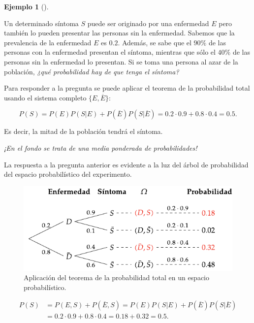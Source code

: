 \documentclass[
  a4paper,
]{scrreport}
\theoremstyle{plain}
\theoremstyle{definition}
\newtheorem{example}{Ejemplo}[chapter]
\theoremstyle{definition}
\theoremstyle{remark}
\begin{document}
\begin{example}[]\protect\hypertarget{exm-probabilidad-total}{}\label{exm-probabilidad-total}

Un determinado síntoma \(S\) puede ser originado por una enfermedad
\(E\) pero también lo pueden presentar las personas sin la enfermedad.
Sabemos que la prevalencia de la enfermedad \(E\) es \(0.2\). Además, se
sabe que el \(90\%\) de las personas con la enfermedad presentan el
síntoma, mientras que sólo el \(40\%\) de las personas sin la enfermedad
lo presentan. Si se toma una persona al azar de la población, \emph{¿qué
probabilidad hay de que tenga el síntoma?}

Para responder a la pregunta se puede aplicar el teorema de la
probabilidad total usando el sistema completo \(\{E,\overline{E}\}\):

\[P(S) = P(E)P(S|E)+P(\overline E)P(S|\overline E) = 0.2\cdot 0.9 + 0.8\cdot 0.4 = 0.5.\]

Es decir, la mitad de la población tendrá el síntoma.

\emph{¡En el fondo se trata de una media ponderada de probabilidades!}

La respuesta a la pregunta anterior es evidente a la luz del árbol de
probabilidad del espacio probabilístico del experimento.

\begin{figure}[H]

{\centering \includegraphics{img/probabilidad/espacio_probabilistico_total.pdf}

}

\caption{Aplicación del teorema de la probabilidad total en un espacio
probabilístico.}

\end{figure}%

\begin{align*}
P(S) &= P(E,S) + P(\overline E,S) = P(E)P(S|E)+P(\overline E)P(S|\overline E)\\
& = 0.2\cdot 0.9+ 0.8\cdot 0.4 = 0.18 + 0.32 = 0.5.
\end{align*}

\end{example}
\end{document}
